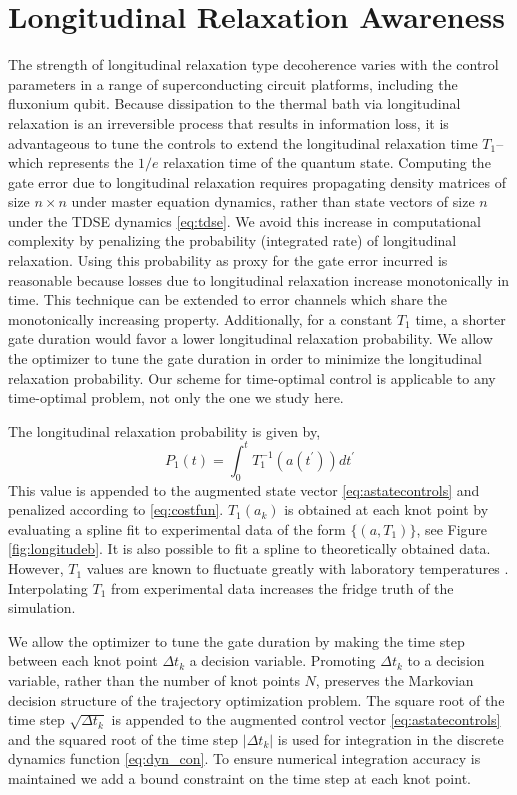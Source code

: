 \section{Longitudinal Relaxation Awareness \label{sec:longitude}}
The strength of longitudinal relaxation type decoherence varies
with the control parameters in a range of superconducting circuit platforms,
including the fluxonium qubit. Because dissipation to the thermal bath
via longitudinal relaxation is an irreversible process that results in information loss,
it is advantageous to tune the controls to extend the longitudinal
relaxation time $T_{1}$--which represents the $1/e$ relaxation time
of the quantum state.
Computing the gate error due to longitudinal relaxation
requires propagating density matrices of size $n \times n$ under master equation
dynamics, rather than state vectors of size $n$ under the TDSE dynamics \eqref{eq:tdse}.
We avoid this increase in computational complexity by
penalizing the probability (integrated rate) of longitudinal relaxation.
Using this probability as proxy for the gate error incurred
is reasonable because losses due to longitudinal relaxation increase monotonically
in time.
This technique can be extended to
error channels which share the monotonically increasing property.
Additionally, for a constant $T_{1}$ time, a shorter gate duration
would favor a lower longitudinal relaxation probability. We allow
the optimizer to tune the gate duration in order to minimize the
longitudinal relaxation probability. Our scheme for time-optimal
control is applicable to any time-optimal problem, not only
the one we study here.

The longitudinal relaxation probability is given by,
\begin{equation}
  P_{1}(t) = \int_{0}^{t} T_{1}^{-1}(a(t^{\prime})) dt^{\prime}
\end{equation}
This value is appended to the augmented state vector \eqref{eq:astatecontrols}
and penalized according to \eqref{eq:costfun}.
$T_{1}(a_{k})$ is obtained at each knot point by evaluating
a spline fit to experimental data of the form $\{(a, T_{1})\}$,
see Figure \ref{fig:longitudeb}.
It is also possible to fit a spline to theoretically obtained data.
However, $T_{1}$ values are known to fluctuate greatly
with laboratory temperatures \cite{klimov2018fluctuations}.
Interpolating $T_{1}$ from experimental data
increases the fridge truth of the simulation.

We allow the optimizer to tune the gate duration by
making the time step between each knot point $\Delta t_{k}$
a decision variable. Promoting $\Delta t_{k}$ to a decision variable, rather
than the number of knot points $N$, preserves the
Markovian decision structure of the trajectory
optimization problem. The square root of the time step $\sqrt{\Delta t_{k}}$
is appended to the augmented control vector \eqref{eq:astatecontrols}
and the squared root
of the time step $\lvert \Delta t_{k} \rvert$ is used
for integration in the discrete dynamics function \eqref{eq:dyn_con}.
To ensure numerical
integration accuracy is maintained we add a bound
constraint on the time step at each knot point.

